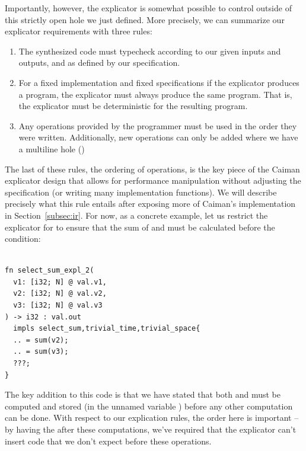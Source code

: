 Importantly, however, the explicator is somewhat possible to control outside of this strictly open  hole we just defined.  More precisely, we can summarize our explicator requirements with three rules:
%
\begin{enumerate}
\item The synthesized code must typecheck according to our given inputs and outputs, and as defined by our specification.
\item For a fixed implementation and fixed specifications if the explicator produces a program, the explicator must always produce the same program.  That is, the explicator must be deterministic for the resulting program.
\item Any operations provided by the programmer must be used in the order they were written.  Additionally, new operations can only be added where we have a multiline hole ()
\end{enumerate}
%
The last of these rules, the ordering of operations, is the key piece of the Caiman explicator design that allows for performance manipulation without adjusting the specification (or writing many implementation functions).  We will describe precisely what this rule entails after exposing more of Caiman's implementation in Section~\ref{subsec:ir}.  For now, as a concrete example, let us restrict the explicator for  to ensure that the sum of  and  must be calculated before the condition:
%
\begin{lstlisting}

fn select_sum_expl_2(
  v1: [i32; N] @ val.v1,
  v2: [i32; N] @ val.v2,
  v3: [i32; N] @ val.v3
) -> i32 : val.out 
  impls select_sum,trivial_time,trivial_space{
  .. = sum(v2);
  .. = sum(v3);
  ???;
}
\end{lstlisting}
%
The key addition to this code is that we have stated that both  and  must be computed and stored (in the unnamed variable ) before any other computation can be done.  With respect to our explication rules, the order here is important -- by having the  after these computations, we've required that the explicator can't insert code that we don't expect before these operations.


